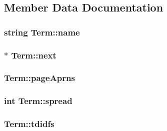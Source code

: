 \subsection{Member Data Documentation}
\hypertarget{class_term_a1ea7886ca15ad219ce8751bc30099483}{}
\subsubsection[{name}]{\setlength{\rightskip}{0pt plus 5cm}string Term\+::name\hspace{0.3cm}{\ttfamily [private]}}\label{class_term_a1ea7886ca15ad219ce8751bc30099483}
\hypertarget{class_term_a32dadebc2046b21eb097d56795a977a4}{}
\subsubsection[{next}]{$\ast$ Term\+::next\hspace{0.3cm}{\ttfamily [private]}}\label{class_term_a32dadebc2046b21eb097d56795a977a4}
\hypertarget{class_term_a8e3efcdc519a46da74930a8a4dba9398}{}
\subsubsection[{page\+Aprns}]{ Term\+::page\+Aprns\hspace{0.3cm}{\ttfamily [private]}}\label{class_term_a8e3efcdc519a46da74930a8a4dba9398}
\hypertarget{class_term_abb3f8b30ce0f7cb8a64b84084b822e43}{}
\subsubsection[{spread}]{\setlength{\rightskip}{0pt plus 5cm}int Term\+::spread\hspace{0.3cm}{\ttfamily [private]}}\label{class_term_abb3f8b30ce0f7cb8a64b84084b822e43}
\hypertarget{class_term_a8a6d9637da60e1200bb91b5108c601b5}{}
\subsubsection[{tdidfs}]{ Term\+::tdidfs\hspace{0.3cm}{\ttfamily [private]}}\label{class_term_a8a6d9637da60e1200bb91b5108c601b5}
\hypertarget{class_term_a075587aedd4009c7c207dc3fdd5b33cd}{}
